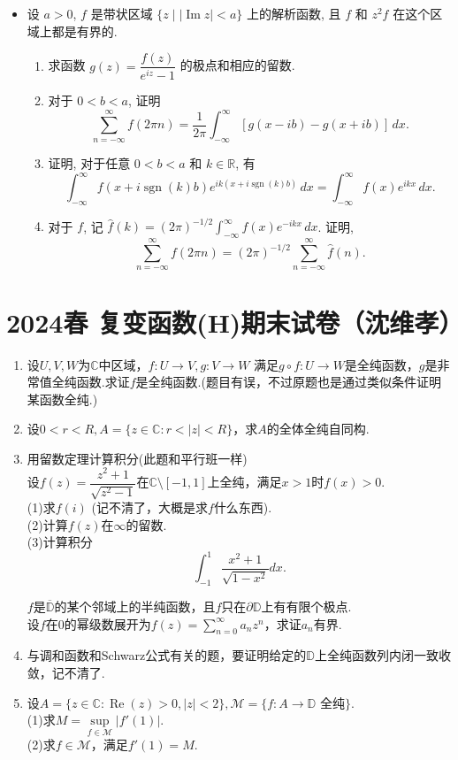 \begin{itemize}
\item[6.] 设 $a > 0$, $f$ 是带状区域 $\{z \mid |\operatorname{Im} z| < a\}$ 上的解析函数, 且 $f$ 和 $z^2 f$ 在这个区域上都是有界的.
\begin{enumerate}
    \item[(a)] 求函数 $g(z) = \dfrac{f(z)}{e^{iz} - 1}$ 的极点和相应的留数.
    \item[(b)] 对于 $0 < b < a$, 证明
    \[ \sum_{n=-\infty}^\infty f(2\pi n) = \frac{1}{2\pi} \int_{-\infty}^\infty [g(x - ib) - g(x + ib)] \, dx. \]
    \item[(c)] 证明, 对于任意 $0 < b < a$ 和 $k \in \mathbb{R}$, 有
    \[ \int_{-\infty}^\infty f(x + i \operatorname{sgn}(k) b) e^{ik(x + i \operatorname{sgn}(k) b)} \, dx = \int_{-\infty}^\infty f(x) e^{ikx} \, dx. \]
    \item[(d)] 对于 $f$, 记 $\hat{f}(k) = (2\pi)^{-1/2} \int_{-\infty}^\infty f(x) e^{-ikx} \, dx$. 证明,
    \[ \sum_{n=-\infty}^\infty f(2\pi n) = (2\pi)^{-1/2} \sum_{n=-\infty}^\infty \hat{f}(n). \]
\end{enumerate}
\end{itemize}


\section{2024春 复变函数(H)期末试卷（沈维孝）}

\begin{enumerate}
    \item 设$U,V,W$为$\mathbb{C}$中区域，$f:U\to V,g:V\to W$
    满足$g\circ f:U\to W$是全纯函数，$g$是非常值全纯函数.求证$f$是全纯函数.(题目有误，不过原题也是通过类似条件证明某函数全纯.)
    
    \item 设$0<r<R,A=\{z\in\mathbb{C}:r<|z|<R\}$，求$A$的全体全纯自同构.

    \item 用留数定理计算积分(此题和平行班一样)\\
    设$f(z)=\dfrac{z^2+1}{\sqrt{z^2-1}}$在$\mathbb{C}\setminus [-1,1]$上全纯，满足$x>1$时$f(x)>0$.\\
    (1)求$f(i)$ (记不清了，大概是求$f$什么东西).\\
    (2)计算$f(z)$在$\infty$的留数.\\
    (3)计算积分$$\int_{-1}^{1}\frac{x^2+1}{\sqrt{1-x^2}}dx.$$

    $f$是$\overline{\mathbb{D}}$的某个邻域上的半纯函数，且$f$只在$\partial\mathbb{D}$上有有限个极点.\\
    设$f$在$0$的幂级数展开为$f(z)=\sum\limits_{n=0}^{\infty}a_nz^n$，求证$a_n$有界.

    \item 与调和函数和Schwarz公式有关的题，要证明给定的$\mathbb{D}$上全纯函数列内闭一致收敛，记不清了.

    \item 设$A=\{z\in \mathbb{C}:\operatorname{Re}(z)>0,|z|<2\},\mathscr{M}=\{f:A\to \mathbb{D}\text{ 全纯}\}.$\\
    (1)求$M=\sup\limits_{f\in\mathscr{M}}|f'(1)|$.\\
    (2)求$f\in\mathscr{M}$，满足$f'(1)=M$.
\end{enumerate}

